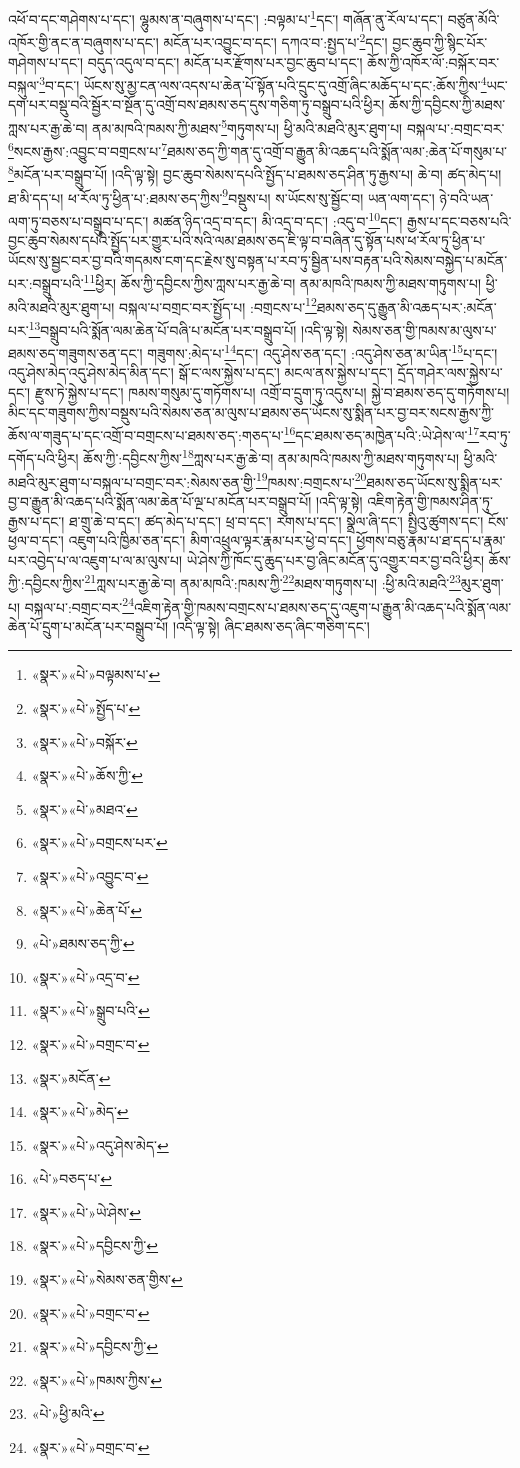 འཕོ་བ་དང་གཤེགས་པ་དང་། ལྷུམས་ན་བཞུགས་པ་དང་། :བལྟམ་པ་\footnote{«སྣར་»«པེ་»བལྟམས་པ་}དང་། གཞོན་ནུ་རོལ་པ་དང་། བཙུན་མོའི་འཁོར་གྱི་ནང་ན་བཞུགས་པ་དང་། མངོན་པར་འབྱུང་བ་དང་། དཀའ་བ་:སྤྱད་པ་\footnote{«སྣར་»«པེ་»སྤྱོད་པ་}དང་། བྱང་ཆུབ་ཀྱི་སྙིང་པོར་གཤེགས་པ་དང་། བདུད་འདུལ་བ་དང་། མངོན་པར་རྫོགས་པར་བྱང་ཆུབ་པ་དང་། ཆོས་ཀྱི་འཁོར་ལོ་:བསྐོར་བར་བསྐུལ་\footnote{«སྣར་»«པེ་»བསྐོར་}བ་དང་། ཡོངས་སུ་མྱ་ངན་ལས་འདས་པ་ཆེན་པོ་སྟོན་པའི་དྲུང་དུ་འགྲོ་ཞིང་མཆོད་པ་དང་:ཆོས་ཀྱིས་\footnote{«སྣར་»«པེ་»ཆོས་ཀྱི་}ཡང་དག་པར་བསྡུ་བའི་སྦྱོར་བ་སྔོན་དུ་འགྲོ་བས་ཐམས་ཅད་དུས་གཅིག་ཏུ་བསྒྲུབ་པའི་ཕྱིར། ཆོས་ཀྱི་དབྱིངས་ཀྱི་མཐས་ཀླས་པར་རྒྱ་ཆེ་བ། ནམ་མཁའི་ཁམས་ཀྱི་མཐས་\footnote{«སྣར་»«པེ་»མཐའ་}གཏུགས་པ། ཕྱི་མའི་མཐའི་མུར་ཐུག་པ། བསྐལ་པ་:བགྲང་བར་\footnote{«སྣར་»«པེ་»བགྲངས་པར་}སངས་རྒྱས་:འབྱུང་བ་བགྲངས་པ་\footnote{«སྣར་»«པེ་»འབྱུང་བ་}ཐམས་ཅད་ཀྱི་གན་དུ་འགྲོ་བ་རྒྱུན་མི་འཆད་པའི་སྨོན་ལམ་:ཆེན་པོ་གསུམ་པ་\footnote{«སྣར་»«པེ་»ཆེན་པོ་}མངོན་པར་བསྒྲུབ་པོ། །འདི་ལྟ་སྟེ། བྱང་ཆུབ་སེམས་དཔའི་སྤྱོད་པ་ཐམས་ཅད་ཤིན་ཏུ་རྒྱས་པ། ཆེ་བ། ཚད་མེད་པ། ཐ་མི་དད་པ། ཕ་རོལ་ཏུ་ཕྱིན་པ་:ཐམས་ཅད་ཀྱིས་\footnote{«པེ་»ཐམས་ཅད་ཀྱི་}བསྡུས་པ། ས་ཡོངས་སུ་སྦྱོང་བ། ཡན་ལག་དང་། ཉེ་བའི་ཡན་ལག་ཏུ་བཅས་པ་བསྒྲུབ་པ་དང་། མཚན་ཉིད་འདྲ་བ་དང་། མི་འདྲ་བ་དང་། :འདུ་བ་\footnote{«སྣར་»«པེ་»འདྲ་བ་}དང་། རྒྱས་པ་དང་བཅས་པའི་བྱང་ཆུབ་སེམས་དཔའི་སྤྱོད་པར་གྱུར་པའི་སའི་ལམ་ཐམས་ཅད་ཇི་ལྟ་བ་བཞིན་དུ་སྟོན་པས་ཕ་རོལ་ཏུ་ཕྱིན་པ་ཡོངས་སུ་སྦྱང་བར་བྱ་བའི་གདམས་ངག་དང་རྗེས་སུ་བསྟན་པ་རབ་ཏུ་སྦྱིན་པས་བརྟན་པའི་སེམས་བསྐྱེད་པ་མངོན་པར་:བསྒྲུབ་པའི་\footnote{«སྣར་»«པེ་»སྒྲུབ་པའི་}ཕྱིར། ཆོས་ཀྱི་དབྱིངས་ཀྱིས་ཀླས་པར་རྒྱ་ཆེ་བ། ནམ་མཁའི་ཁམས་ཀྱི་མཐས་གཏུགས་པ། ཕྱི་མའི་མཐའི་མུར་ཐུག་པ། བསྐལ་པ་བགྲང་བར་སྤྱོད་པ། :བགྲངས་པ་\footnote{«སྣར་»«པེ་»བགྲང་བ་}ཐམས་ཅད་དུ་རྒྱུན་མི་འཆད་པར་:མངོན་པར་\footnote{«སྣར་»མངོན་}བསྒྲུབ་པའི་སྨོན་ལམ་ཆེན་པོ་བཞི་པ་མངོན་པར་བསྒྲུབ་པོ། །འདི་ལྟ་སྟེ། སེམས་ཅན་གྱི་ཁམས་མ་ལུས་པ་ཐམས་ཅད་གཟུགས་ཅན་དང་། གཟུགས་:མེད་པ་\footnote{«སྣར་»«པེ་»མེད་}དང་། འདུ་ཤེས་ཅན་དང་། :འདུ་ཤེས་ཅན་མ་ཡིན་\footnote{«སྣར་»«པེ་»འདུ་ཤེས་མེད་}པ་དང་། འདུ་ཤེས་མེད་འདུ་ཤེས་མེད་མིན་དང་། སྒོ་ང་ལས་སྐྱེས་པ་དང་། མངལ་ནས་སྐྱེས་པ་དང་། དྲོད་གཤེར་ལས་སྐྱེས་པ་དང་། རྫུས་ཏེ་སྐྱེས་པ་དང་། ཁམས་གསུམ་དུ་གཏོགས་པ། འགྲོ་བ་དྲུག་ཏུ་འདུས་པ། སྐྱེ་བ་ཐམས་ཅད་དུ་གཏོགས་པ། མིང་དང་གཟུགས་ཀྱིས་བསྡུས་པའི་སེམས་ཅན་མ་ལུས་པ་ཐམས་ཅད་ཡོངས་སུ་སྨིན་པར་བྱ་བར་སངས་རྒྱས་ཀྱི་ཆོས་ལ་གཟུད་པ་དང་འགྲོ་བ་བགྲངས་པ་ཐམས་ཅད་:གཅད་པ་\footnote{«པེ་»བཅད་པ་}དང་ཐམས་ཅད་མཁྱེན་པའི་:ཡེ་ཤེས་ལ་\footnote{«སྣར་»«པེ་»ཡེ་ཤེས་}རབ་ཏུ་དགོད་པའི་ཕྱིར། ཆོས་ཀྱི་:དབྱིངས་ཀྱིས་\footnote{«སྣར་»«པེ་»དབྱིངས་ཀྱི་}ཀླས་པར་རྒྱ་ཆེ་བ། ནམ་མཁའི་ཁམས་ཀྱི་མཐས་གཏུགས་པ། ཕྱི་མའི་མཐའི་མུར་ཐུག་པ་བསྐལ་པ་བགྲང་བར་:སེམས་ཅན་གྱི་\footnote{«སྣར་»«པེ་»སེམས་ཅན་གྱིས་}ཁམས་:བགྲངས་པ་\footnote{«སྣར་»«པེ་»བགྲང་བ་}ཐམས་ཅད་ཡོངས་སུ་སྨིན་པར་བྱ་བ་རྒྱུན་མི་འཆད་པའི་སྨོན་ལམ་ཆེན་པོ་ལྔ་པ་མངོན་པར་བསྒྲུབ་པོ། །འདི་ལྟ་སྟེ། འཇིག་རྟེན་གྱི་ཁམས་ཤིན་ཏུ་རྒྱས་པ་དང་། ཐ་གྲུ་ཆེ་བ་དང་། ཚད་མེད་པ་དང་། ཕྲ་བ་དང་། རགས་པ་དང་། སྣྲེལ་ཞི་དང་། སྤྱིའུ་ཚུགས་དང་། ངོས་ཕྱལ་བ་དང་། འཇུག་པའི་ཁྱིམ་ཅན་དང་། མིག་འཕྲུལ་ལྟར་རྣམ་པར་ཕྱེ་བ་དང་། ཕྱོགས་བཅུ་རྣམ་པ་ཐ་དད་པ་རྣམ་པར་འབྱེད་པ་ལ་འཇུག་པ་ལ་མ་ལུས་པ། ཡེ་ཤེས་ཀྱི་ཁོང་དུ་ཆུད་པར་བྱ་ཞིང་མངོན་དུ་འགྱུར་བར་བྱ་བའི་ཕྱིར། ཆོས་ཀྱི་:དབྱིངས་ཀྱིས་\footnote{«སྣར་»«པེ་»དབྱིངས་ཀྱི་}ཀླས་པར་རྒྱ་ཆེ་བ། ནམ་མཁའི་:ཁམས་ཀྱི་\footnote{«སྣར་»«པེ་»ཁམས་ཀྱིས་}མཐས་གཏུགས་པ། :ཕྱི་མའི་མཐའི་\footnote{«པེ་»ཕྱི་མའི་}མུར་ཐུག་པ། བསྐལ་པ་:བགྲང་བར་\footnote{«སྣར་»«པེ་»བགྲང་བ་}འཇིག་རྟེན་གྱི་ཁམས་བགྲངས་པ་ཐམས་ཅད་དུ་འཇུག་པ་རྒྱུན་མི་འཆད་པའི་སྨོན་ལམ་ཆེན་པོ་དྲུག་པ་མངོན་པར་བསྒྲུབ་པོ། །འདི་ལྟ་སྟེ། ཞིང་ཐམས་ཅད་ཞིང་གཅིག་དང་། 